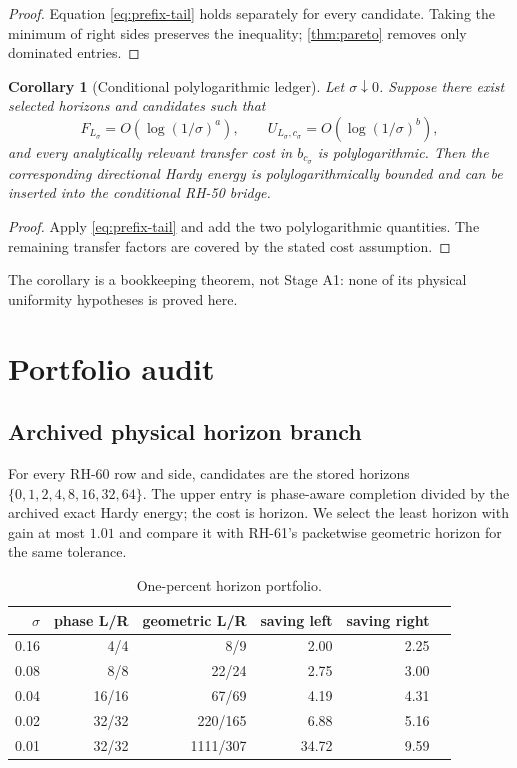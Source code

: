 \documentclass[11pt]{article}
\newtheorem{corollary}[theorem]{Corollary}
\theoremstyle{definition}
\begin{document}
\begin{proof}
Equation \eqref{eq:prefix-tail} holds separately for every candidate.  Taking
the minimum of right sides preserves the inequality; \cref{thm:pareto}
removes only dominated entries.
\end{proof}

\begin{corollary}[Conditional polylogarithmic ledger]
\label{cor:conditional}
Let $\sigma\downarrow0$.  Suppose there exist selected horizons and
candidates such that
\begin{equation}
 F_{L_\sigma}=O(\log(1/\sigma)^a),
 \qquad
 U_{L_\sigma,c_\sigma}=O(\log(1/\sigma)^b),
 \label{eq:polylog-upper}
\end{equation}
and every analytically relevant transfer cost in $b_{c_\sigma}$ is
polylogarithmic.  Then the corresponding directional Hardy energy is
polylogarithmically bounded and can be inserted into the conditional RH-50
bridge.
\end{corollary}

\begin{proof}
Apply \eqref{eq:prefix-tail} and add the two polylogarithmic quantities.  The
remaining transfer factors are covered by the stated cost assumption.
\end{proof}

The corollary is a bookkeeping theorem, not Stage A1: none of its physical
uniformity hypotheses is proved here.

\section{Portfolio audit}
\label{sec:audit}

\subsection{Archived physical horizon branch}

For every RH-60 row and side, candidates are the stored horizons
$\{0,1,2,4,8,16,32,64\}$.  The upper entry is phase-aware completion divided
by the archived exact Hardy energy; the cost is horizon.  We select the least
horizon with gain at most $1.01$ and compare it with RH-61's packetwise
geometric horizon for the same tolerance.

\begin{table}[H]
\centering
\caption{One-percent horizon portfolio.}
\label{tab:physical}
\begin{tabular}{rrrrrr}
\toprule
$\sigma$ & phase L/R & geometric L/R & saving left & saving right\\
\midrule
0.16 & 4/4   & 8/9     & 2.00 & 2.25\\
0.08 & 8/8   & 22/24   & 2.75 & 3.00\\
0.04 & 16/16 & 67/69   & 4.19 & 4.31\\
0.02 & 32/32 & 220/165 & 6.88 & 5.16\\
0.01 & 32/32 & 1111/307& 34.72& 9.59\\
\bottomrule
\end{tabular}
\end{table}
\end{document}
